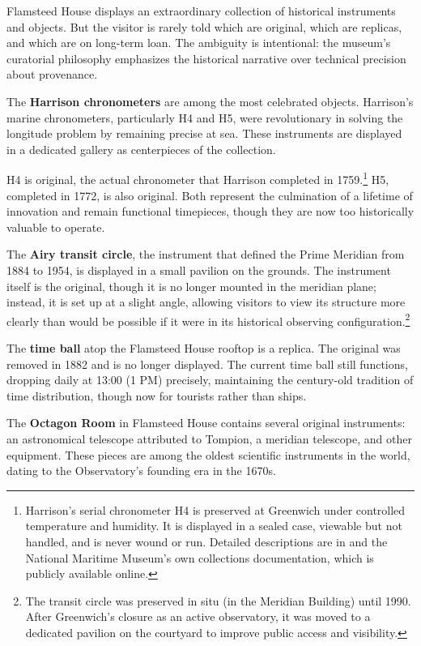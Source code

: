 Flamsteed House displays an extraordinary collection of historical instruments and objects. But the visitor is rarely told which are original, which are replicas, and which are on long-term loan. The ambiguity is intentional: the museum's curatorial philosophy emphasizes the historical narrative over technical precision about provenance.

The \textbf{Harrison chronometers} are among the most celebrated objects. Harrison's marine chronometers, particularly H4 and H5, were revolutionary in solving the longitude problem by remaining precise at sea. These instruments are displayed in a dedicated gallery as centerpieces of the collection.

H4 is original, the actual chronometer that Harrison completed in 1759.\footnote{Harrison's serial chronometer \textsc{H4} is preserved at Greenwich under controlled temperature and humidity. It is displayed in a sealed case, viewable but not handled, and is never wound or run. Detailed descriptions are in \textcite{Betts2006} and the National Maritime Museum's own collections documentation, which is publicly available online.} H5, completed in 1772, is also original. Both represent the culmination of a lifetime of innovation and remain functional timepieces, though they are now too historically valuable to operate.

The \textbf{Airy transit circle}, the instrument that defined the Prime Meridian from 1884 to 1954, is displayed in a small pavilion on the grounds. The instrument itself is the original, though it is no longer mounted in the meridian plane; instead, it is set up at a slight angle, allowing visitors to view its structure more clearly than would be possible if it were in its historical observing configuration.\footnote{The transit circle was preserved in situ (in the Meridian Building) until 1990. After Greenwich's closure as an active observatory, it was moved to a dedicated pavilion on the courtyard to improve public access and visibility.}

The \textbf{time ball} atop the Flamsteed House rooftop is a replica. The original was removed in 1882 and is no longer displayed. The current time ball still functions, dropping daily at 13:00 (1 \textsc{PM}) precisely, maintaining the century-old tradition of time distribution, though now for tourists rather than ships.

The \textbf{Octagon Room} in Flamsteed House contains several original instruments: an astronomical telescope attributed to Tompion, a meridian telescope, and other equipment. These pieces are among the oldest scientific instruments in the world, dating to the Observatory's founding era in the 1670s.


